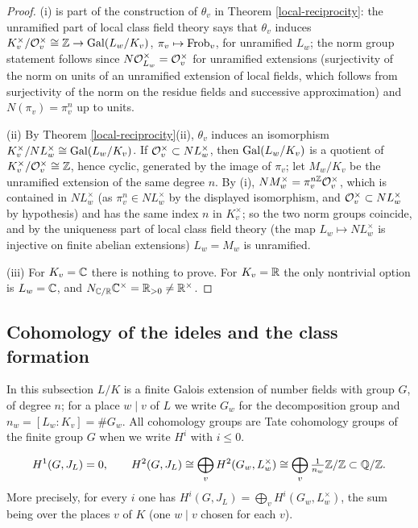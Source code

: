 \begin{proof}
(i) is part of the construction of $\theta_v$ in Theorem
\ref{local-reciprocity}: the unramified part of local class field theory says
that $\theta_v$ induces $K_v^\times/{\mathcal {O}}_v^\times\cong{\mathbb {Z}}\to{\mathrm{Gal}}(L_w/K_v)$,
$\pi_v\mapsto{\mathrm{Frob}}_v$, for unramified $L_w$; the norm group statement follows
since $N{\mathcal {O}}_{L_w}^\times={\mathcal {O}}_v^\times$ for unramified extensions
(surjectivity of the norm on units of an unramified extension of local fields,
which follows from surjectivity of the norm on the residue fields and
successive approximation) and $N(\pi_v)=\pi_v^n$ up to units.

(ii) By Theorem \ref{local-reciprocity}(ii), $\theta_v$ induces an isomorphism
$K_v^\times/N L_w^\times\cong{\mathrm{Gal}}(L_w/K_v)$.
If ${\mathcal {O}}_v^\times\subset NL_w^\times$, then ${\mathrm{Gal}}(L_w/K_v)$ is a quotient of
$K_v^\times/{\mathcal {O}}_v^\times\cong{\mathbb {Z}}$, hence cyclic, generated by the image of
$\pi_v$; let $M_w/K_v$ be the unramified extension of the same degree $n$.
By (i), $NM_w^\times=\pi_v^{n{\mathbb {Z}}}{\mathcal {O}}_v^\times$, which is contained in
$NL_w^\times$ (as $\pi_v^n\in NL_w^\times$ by the displayed isomorphism, and
${\mathcal {O}}_v^\times\subset NL_w^\times$ by hypothesis) and has the same index $n$ in
$K_v^\times$; so the two norm groups coincide, and by the uniqueness part of
local class field theory (the map $L_w\mapsto NL_w^\times$ is injective on
finite abelian extensions) $L_w=M_w$ is unramified.

(iii) For $K_v={\mathbb {C}}$ there is nothing to prove. For $K_v={\mathbb {R}}$ the only nontrivial
option is $L_w={\mathbb {C}}$, and $N_{{\mathbb {C}}/{\mathbb {R}}}{\mathbb {C}}^\times={\mathbb {R}}_{>0}\neq{\mathbb {R}}^\times$.
\end{proof}

\subsection{Cohomology of the ideles and the class formation}

In this subsection $L/K$ is a finite Galois extension of number fields with group
$G$, of degree $n$; for a place $w\mid v$ of $L$ we write $G_w$ for the
decomposition group and $n_w=[L_w:K_v]=\#G_w$.
All cohomology groups are Tate cohomology groups of the finite group $G$ when we
write $H^i$ with $i\leq 0$.

\begin{prop}
\label{cohomology-of-ideles}
$$H^1(G,J_L)=0,\qquad
H^2(G,J_L)\cong\bigoplus_v H^2(G_w,L_w^\times)
\cong\bigoplus_v\tfrac1{n_w}{\mathbb {Z}}/{\mathbb {Z}}\subset{\mathbb {Q}}/{\mathbb {Z}} .$$
More precisely, for every $i$ one has
$H^i(G,J_L)=\bigoplus_vH^i(G_w,L_w^\times)$, the sum being over the places $v$
of $K$ (one $w\mid v$ chosen for each $v$).
\end{prop}

